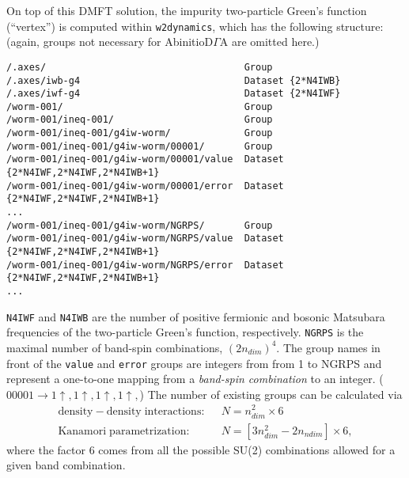 \documentclass[a4paper,11pt]{article}
\numberwithin{equation}{section} %
\begin{document}
On top of this DMFT solution, the impurity two-particle Green's function (``vertex'') is computed within \verb|w2dynamics|,
which has the following structure: (again, groups not necessary for AbinitioD$\Gamma$A 
are omitted here.)
\begin{lstlisting}[caption=worm-sampled vertex structure, frame=single, basicstyle=\small]
/.axes/                                   Group
/.axes/iwb-g4                             Dataset {2*N4IWB}
/.axes/iwf-g4                             Dataset {2*N4IWF}
/worm-001/                                Group 
/worm-001/ineq-001/                       Group
/worm-001/ineq-001/g4iw-worm/             Group
/worm-001/ineq-001/g4iw-worm/00001/       Group
/worm-001/ineq-001/g4iw-worm/00001/value  Dataset {2*N4IWF,2*N4IWF,2*N4IWB+1}
/worm-001/ineq-001/g4iw-worm/00001/error  Dataset {2*N4IWF,2*N4IWF,2*N4IWB+1}
...
/worm-001/ineq-001/g4iw-worm/NGRPS/       Group
/worm-001/ineq-001/g4iw-worm/NGRPS/value  Dataset {2*N4IWF,2*N4IWF,2*N4IWB+1}
/worm-001/ineq-001/g4iw-worm/NGRPS/error  Dataset {2*N4IWF,2*N4IWF,2*N4IWB+1}
...
\end{lstlisting}
\verb|N4IWF| and \verb|N4IWB| are the number of positive fermionic and bosonic Matsubara frequencies of the
two-particle Green's function, respectively. \verb|NGRPS| is the maximal number of band-spin combinations, $(2n_{dim})^4$.
The group names in front of the \verb|value| and \verb|error| groups are integers from from 1 to NGRPS and represent a one-to-one mapping from a \emph{band-spin combination} to an integer. ($00001 \rightarrow 1\uparrow, 1\uparrow, 1\uparrow, 1\uparrow, $) The number of existing groups can be calculated via
\begin{equation*}
\begin{aligned}
\mathrm{density-density\;interactions: }&\;\; N = n_{dim}^2 \times 6 \\
\mathrm{Kanamori\;parametrization: }&\;\; N = \left[3n_{dim}^2 - 2n_{ndim}\right] \times 6,
\end{aligned}
\end{equation*}
where the factor $6$ comes from all the possible SU(2) combinations allowed for a given band combination.

\newpage
\end{document}
